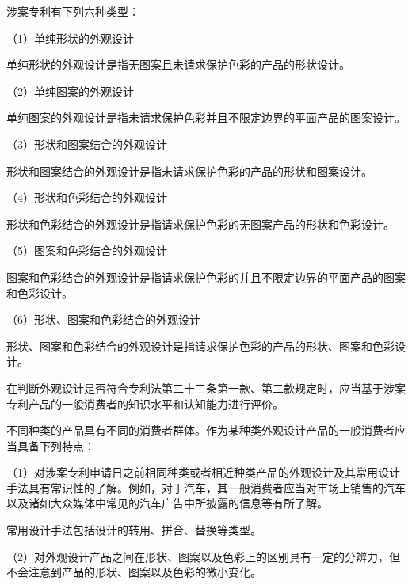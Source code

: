 涉案专利有下列六种类型：

{\setlength{\parindent}{17.1bp}（1）单纯形状的外观设计\par}

单纯形状的外观设计是指无图案且未请求保护色彩的产品的形状设计。

{\setlength{\parindent}{17.1bp}（2）单纯图案的外观设计\par}

单纯图案的外观设计是指未请求保护色彩并且不限定边界的平面产品的图案设计。

{\setlength{\parindent}{17.1bp}（3）形状和图案结合的外观设计\par}

形状和图案结合的外观设计是指未请求保护色彩的产品的形状和图案设计。

{\setlength{\parindent}{17.1bp}（4）形状和色彩结合的外观设计\par}

形状和色彩结合的外观设计是指请求保护色彩的无图案产品的形状和色彩设计。

{\setlength{\parindent}{17.1bp}（5）图案和色彩结合的外观设计\par}

图案和色彩结合的外观设计是指请求保护色彩的并且不限定边界的平面产品的图案和色彩设计。

{\setlength{\parindent}{17.1bp}（6）形状、图案和色彩结合的外观设计\par}

形状、图案和色彩结合的外观设计是指请求保护色彩的产品的形状、图案和色彩设计。

在判断外观设计是否符合专利法第二十三条第一款、第二款规定时，应当基于涉案专利产品的一般消费者的知识水平和认知能力进行评价。

不同种类的产品具有不同的消费者群体。作为某种类外观设计产品的一般消费者应当具备下列特点：

{\setlength{\parindent}{17.1bp}（1）对涉案专利申请日之前相同种类或者相近种类产品的外观设计及其常用设计手法具有常识性的了解。例如，对于汽车，其一般消费者应当对市场上销售的汽车以及诸如大众媒体中常见的汽车广告中所披露的信息等有所了解。\par}

常用设计手法包括设计的转用、拼合、替换等类型。

{\setlength{\parindent}{17.1bp}（2）对外观设计产品之间在形状、图案以及色彩上的区别具有一定的分辨力，但不会注意到产品的形状、图案以及色彩的微小变化。\par}

